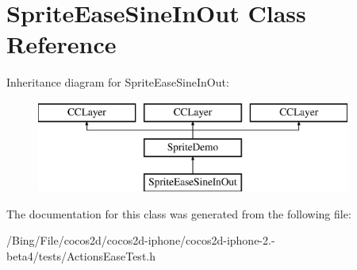 \hypertarget{interface_sprite_ease_sine_in_out}{\section{Sprite\-Ease\-Sine\-In\-Out Class Reference}
\label{interface_sprite_ease_sine_in_out}
}
Inheritance diagram for Sprite\-Ease\-Sine\-In\-Out\-:\begin{figure}[H]
\begin{center}
\leavevmode
\includegraphics[height=3.000000cm]{interface_sprite_ease_sine_in_out}
\end{center}
\end{figure}


The documentation for this class was generated from the following file\-:\begin{DoxyCompactItemize}
\item 
/\-Bing/\-File/cocos2d/cocos2d-\/iphone/cocos2d-\/iphone-\/2.-\/beta4/tests/Actions\-Ease\-Test.\-h\end{DoxyCompactItemize}
